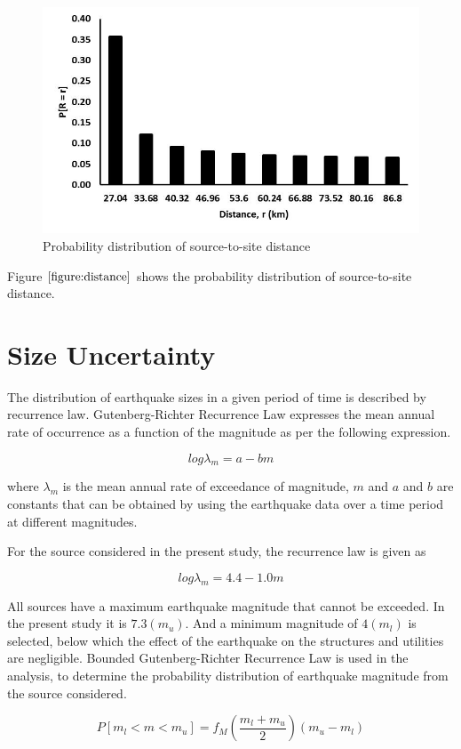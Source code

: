 \documentclass[a4paper,english,12pt]{article}
\begin{document}
\begin{figure}[h!]
\graphicspath{ {images/} }
\includegraphics[width=\textwidth]{P_r}
\caption{Probability distribution of source-to-site distance}
\label{figure:distance}
\centering
\end{figure}

Figure $\ref{figure:distance}$ shows the probability distribution of source-to-site distance. 
\section{Size Uncertainty}
The distribution of earthquake sizes in a given period of time is described by recurrence law. Gutenberg-Richter Recurrence Law expresses the mean annual rate of occurrence as a function of the magnitude as per the following expression.

$$log \lambda_m = a - b m$$

where $\lambda_m$ is the mean annual rate of exceedance of magnitude, $m$ and $a$ and $b$ are constants that can be obtained by using the earthquake data over a time period at different magnitudes.

For the source considered in the present study, the recurrence law is given as

$$log \lambda_m = 4.4 - 1.0 m$$

All sources have a maximum earthquake magnitude that cannot be exceeded. In the present study it is $7.3 (m_u)$. And a minimum magnitude of $4 (m_l)$ is selected, below which the effect of the earthquake on the structures and utilities are negligible. Bounded Gutenberg-Richter Recurrence Law is used in the analysis, to determine the probability distribution of earthquake magnitude from the source considered.

$$P[m_l < m < m_u] = f_M (\frac{m_l + m_u}{2})(m_u - m_l)$$
\end{document}
